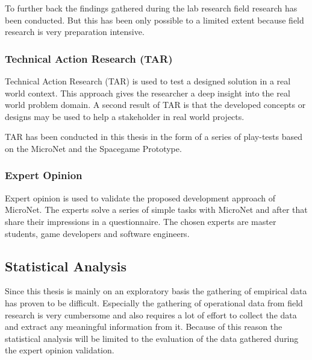 To further back the findings gathered during the lab research field research has
been conducted. But this has been only possible to a limited extent because
field research is very preparation intensive. 

\subsubsection{Technical Action Research (TAR)}

Technical Action Research (TAR) is used to test a designed solution in a real
world context. This approach gives the researcher a deep insight into the real
world problem domain. A second result of TAR is that the developed concepts
or designs may be used to help a stakeholder in real world projects.

TAR has been conducted in this thesis in the form of a series of play-tests
based on the MicroNet and the Spacegame Prototype.

\subsubsection{Expert Opinion}

Expert opinion is used to validate the proposed development approach of
MicroNet. The experts solve a series of simple tasks with MicroNet and after
that share their impressions in a questionnaire. The chosen experts are master
students, game developers and software engineers.

\subsection{Statistical Analysis}

Since this thesis is mainly on an exploratory basis the gathering of empirical
data has proven to be difficult. Especially the gathering of operational data from
field research is very cumbersome and also requires a lot of effort to collect
the data and extract any meaningful information from it. Because of this
reason the statistical analysis will be limited to the evaluation of the data
gathered during the expert opinion validation.






